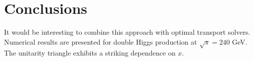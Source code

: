 \section{Conclusions}\label{sec:conclusions}

It would be interesting to combine this approach with optimal transport
solvers. Numerical results are presented for double Higgs production at
$\sqrt{s} = 240$ GeV. The unitarity triangle exhibits a striking
dependence on $x$.

